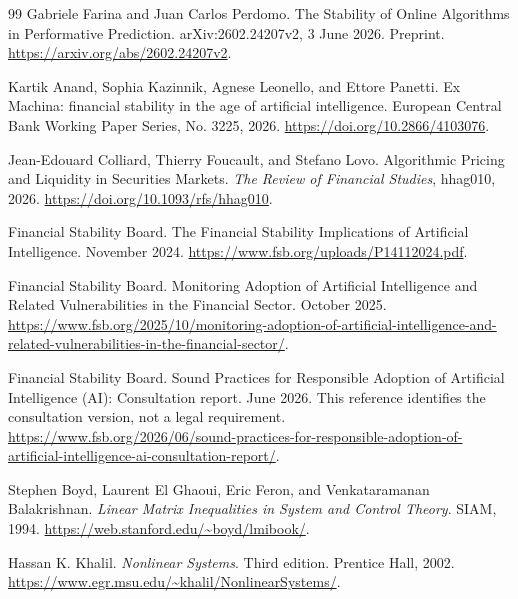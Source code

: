 \documentclass[11pt,a4paper]{article}
\theoremstyle{definition}
\theoremstyle{remark}
\begin{document}
\begin{thebibliography}{99}
Gabriele Farina and Juan Carlos Perdomo.
\newblock The Stability of Online Algorithms in Performative Prediction.
\newblock arXiv:2602.24207v2, 3 June 2026. Preprint.
\newblock \url{https://arxiv.org/abs/2602.24207v2}.

Kartik Anand, Sophia Kazinnik, Agnese Leonello, and Ettore Panetti.
\newblock Ex Machina: financial stability in the age of artificial intelligence.
\newblock European Central Bank Working Paper Series, No. 3225, 2026.
\newblock \url{https://doi.org/10.2866/4103076}.

Jean-Edouard Colliard, Thierry Foucault, and Stefano Lovo.
\newblock Algorithmic Pricing and Liquidity in Securities Markets.
\newblock \emph{The Review of Financial Studies}, hhag010, 2026.
\newblock \url{https://doi.org/10.1093/rfs/hhag010}.

Financial Stability Board.
\newblock The Financial Stability Implications of Artificial Intelligence.
 November 2024.
\newblock \url{https://www.fsb.org/uploads/P14112024.pdf}.

Financial Stability Board.
\newblock Monitoring Adoption of Artificial Intelligence and Related Vulnerabilities in the Financial Sector.
 October 2025.
\newblock \url{https://www.fsb.org/2025/10/monitoring-adoption-of-artificial-intelligence-and-related-vulnerabilities-in-the-financial-sector/}.

Financial Stability Board.
\newblock Sound Practices for Responsible Adoption of Artificial Intelligence (AI): Consultation report.
 June 2026. This reference identifies the consultation version, not a legal requirement.
\newblock \url{https://www.fsb.org/2026/06/sound-practices-for-responsible-adoption-of-artificial-intelligence-ai-consultation-report/}.

Stephen Boyd, Laurent El Ghaoui, Eric Feron, and Venkataramanan Balakrishnan.
\newblock \emph{Linear Matrix Inequalities in System and Control Theory}.
\newblock SIAM, 1994.
\newblock \url{https://web.stanford.edu/~boyd/lmibook/}.

Hassan K. Khalil.
\newblock \emph{Nonlinear Systems}. Third edition.
\newblock Prentice Hall, 2002.
\newblock \url{https://www.egr.msu.edu/~khalil/NonlinearSystems/}.


\end{thebibliography}
\end{document}
